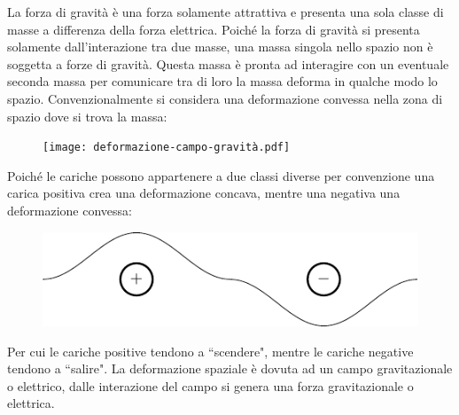 \documentclass{article}
\numberwithin{equation}{subsection}
\begin{document}
La forza di gravità è una forza solamente attrattiva e presenta una sola classe di masse a differenza della forza elettrica. Poiché la forza di gravità si 
presenta solamente dall'interazione tra due masse, una massa singola nello spazio non è soggetta a forze di gravità. Questa massa è pronta ad interagire con un eventuale 
seconda massa per comunicare tra di loro la massa deforma in qualche modo lo spazio. Convenzionalmente si considera una deformazione convessa nella zona di spazio dove 
si trova la massa: 
\begin{figure}[H]%
    \centering
    \texttt{[image: deformazione-campo-gravità.pdf]}%
    \label{fig:deformazione-campo-gravità}
\end{figure}

Poiché le cariche possono appartenere a due classi diverse per convenzione una carica positiva crea una deformazione concava, mentre una negativa una deformazione convessa: 
\begin{figure}[H]%
    \centering
    \includegraphics{deformazione-campo-elettrico.pdf}
    \label{fig:deformazione-campo-elettrico}
\end{figure}
Per cui le cariche positive tendono a ``scendere", mentre le cariche negative tendono a ``salire". La deformazione spaziale è dovuta ad un campo gravitazionale o elettrico, 
dalle interazione del campo si genera una forza gravitazionale o elettrica. 
\end{document}
